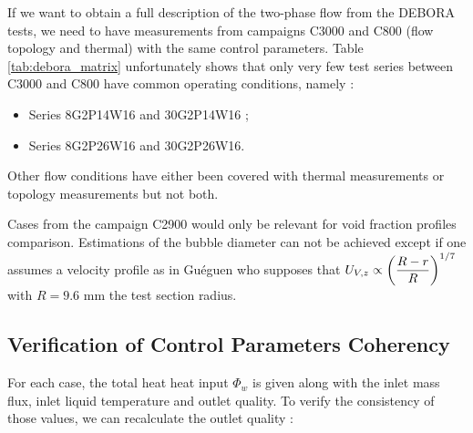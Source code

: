 \begin{table}[!h]
\npar

\noindent{}

\caption{Test matrix of the DEBORA cases. $\bigcirc$ : C800 - $\bigtriangledown$ : C2900 - $\bigtriangleup$ : C3000 }%
\label{tab:debora_matrix}
\end{table}


If we want to obtain a full description of the two-phase flow from the DEBORA tests, we need to have measurements from campaigns C3000 and C800 (flow topology and thermal) with the same control parameters. Table \ref{tab:debora_matrix} unfortunately shows that only very few test series between C3000 and C800 have common operating conditions, namely :

\begin{itemize}
\item Series 8G2P14W16 and 30G2P14W16 ;
\item Series 8G2P26W16 and 30G2P26W16.
\end{itemize}

Other flow conditions have either been covered with thermal measurements or topology measurements but not both. 

\begin{remark*}{}
Cases from the campaign C2900 would only be relevant for void fraction profiles comparison. Estimations of the bubble diameter can not be achieved except if one assumes a velocity profile as in Guéguen \cite{gueguen_phd} who supposes that $U_{V,z} \propto \left(  \dfrac{R-r}{R}  \right)^{1/7}$ with $R=9.6$ mm the test section radius.
\end{remark*}


\subsection{Verification of Control Parameters Coherency}

For each case, the total heat heat input $\Phi_{w}$ is given along with the inlet mass flux, inlet liquid temperature and outlet quality. To verify the consistency of those values, we can recalculate the outlet quality :

